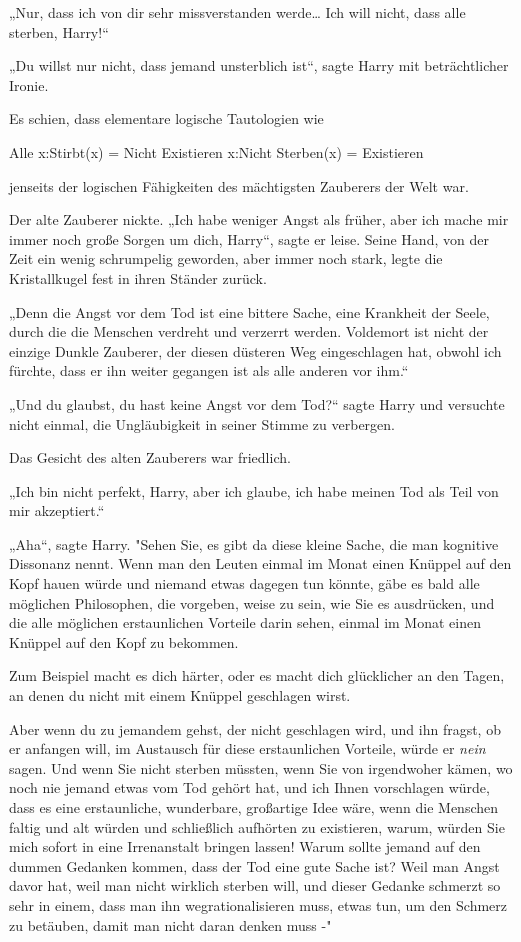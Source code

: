 {„Nur, dass ich von dir sehr missverstanden werde… Ich will nicht, dass alle sterben, Harry!“

„Du willst nur nicht, dass jemand unsterblich ist“, sagte Harry mit beträchtlicher Ironie.

Es schien, dass elementare logische Tautologien wie

Alle x:Stirbt(x) = Nicht Existieren x:Nicht Sterben(x) = Existieren

jenseits der logischen Fähigkeiten des mächtigsten Zauberers der Welt war.

Der alte Zauberer nickte. „Ich habe weniger Angst als früher, aber ich mache mir immer noch große Sorgen um dich, Harry“, sagte er leise. Seine Hand, von der Zeit ein wenig schrumpelig geworden, aber immer noch stark, legte die Kristallkugel fest in ihren Ständer zurück.

„Denn die Angst vor dem Tod ist eine bittere Sache, eine Krankheit der Seele, durch die die Menschen verdreht und verzerrt werden. Voldemort ist nicht der einzige Dunkle Zauberer, der diesen düsteren Weg eingeschlagen hat, obwohl ich fürchte, dass er ihn weiter gegangen ist als alle anderen vor ihm.“

„Und du glaubst, du hast keine Angst vor dem Tod?“ sagte Harry und versuchte nicht einmal, die Ungläubigkeit in seiner Stimme zu verbergen.

Das Gesicht des alten Zauberers war friedlich.

„Ich bin nicht perfekt, Harry, aber ich glaube, ich habe meinen Tod als Teil von mir akzeptiert.“

„Aha“, sagte Harry. "Sehen Sie, es gibt da diese kleine Sache, die man kognitive Dissonanz nennt. Wenn man den Leuten einmal im Monat einen Knüppel auf den Kopf hauen würde und niemand etwas dagegen tun könnte, gäbe es bald alle möglichen Philosophen, die vorgeben, weise zu sein, wie Sie es ausdrücken, und die alle möglichen erstaunlichen Vorteile darin sehen, einmal im Monat einen Knüppel auf den Kopf zu bekommen.

Zum Beispiel macht es dich härter, oder es macht dich glücklicher an den Tagen, an denen du nicht mit einem Knüppel geschlagen wirst.

Aber wenn du zu jemandem gehst, der nicht geschlagen wird, und ihn fragst, ob er anfangen will, im Austausch für diese erstaunlichen Vorteile, würde er \emph{nein} sagen. Und wenn Sie nicht sterben müssten, wenn Sie von irgendwoher kämen, wo noch nie jemand etwas vom Tod gehört hat, und ich Ihnen vorschlagen würde, dass es eine erstaunliche, wunderbare, großartige Idee wäre, wenn die Menschen faltig und alt würden und schließlich aufhörten zu existieren, warum, würden Sie mich sofort in eine Irrenanstalt bringen lassen! Warum sollte jemand auf den dummen Gedanken kommen, dass der Tod eine gute Sache ist? Weil man Angst davor hat, weil man nicht wirklich sterben will, und dieser Gedanke schmerzt so sehr in einem, dass man ihn wegrationalisieren muss, etwas tun, um den Schmerz zu betäuben, damit man nicht daran denken muss -"

}
